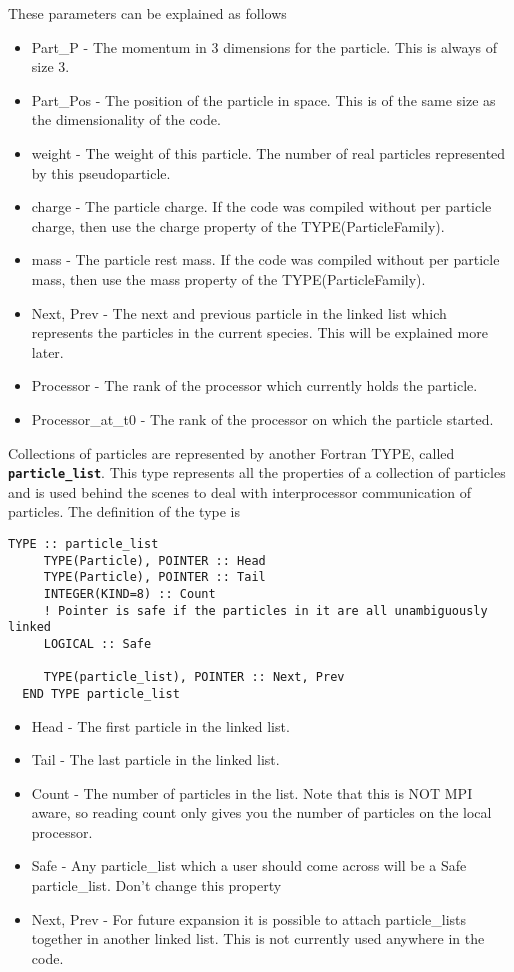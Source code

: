 \documentclass[12pt,a4paper]{article}
\newcommand{\simpleboxverbatim}{\begin{Verbatim}[obeytabs=true,frame=single,
  framerule=0.5mm,rulecolor=\color{warwickmid},formatcom=\color{black}]}
\newcommand{\inlinecode}[1]{{\color{warwickred} \bf\texttt{#1}}}
\begin{document}
These parameters can be explained as follows
\begin{itemize}
\item Part\_P - The momentum in 3 dimensions for the particle. This is always
  of size 3.
\item Part\_Pos - The position of the particle in space. This is of the same
  size as the dimensionality of the code.
\item weight - The weight of this particle. The number of real particles
  represented by this pseudoparticle.
\item charge - The particle charge. If the code was compiled without per
  particle charge, then use the charge property of the TYPE(ParticleFamily).
\item mass - The particle rest mass. If the code was compiled without per
  particle mass, then use the mass property of the TYPE(ParticleFamily).
\item Next, Prev - The next and previous particle in the linked list which
  represents the particles in the current species. This will be explained more
  later.
\item Processor - The rank of the processor which currently holds the
  particle.
\item Processor\_at\_t0 - The rank of the processor on which the particle
  started.
\end{itemize}

Collections of particles are represented by another Fortran TYPE, called
\inlinecode{particle\_list}. This type represents all the properties of a
collection of particles and is used behind the scenes to deal with
interprocessor communication of particles. The definition of the type is

\simpleboxverbatim
  TYPE :: particle_list
     TYPE(Particle), POINTER :: Head
     TYPE(Particle), POINTER :: Tail
     INTEGER(KIND=8) :: Count
     ! Pointer is safe if the particles in it are all unambiguously linked
     LOGICAL :: Safe

     TYPE(particle_list), POINTER :: Next, Prev
  END TYPE particle_list
\end{Verbatim}
\begin{itemize}
\item Head - The first particle in the linked list.
\item Tail - The last particle in the linked list.
\item Count - The number of particles in the list. Note that this is NOT MPI
  aware, so reading count only gives you the number of particles on the local
  processor.
\item Safe - Any particle\_list which a user should come across will be a Safe
  particle\_list. Don't change this property
\item Next, Prev - For future expansion it is possible to attach particle\_lists
  together in another linked list. This is not currently used anywhere in the
  code.
\end{itemize}
\end{document}
